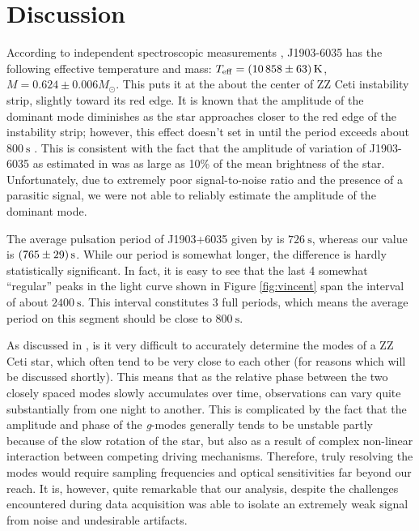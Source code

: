 \documentclass{aastex631}
\begin{document}
\section{Discussion}
According to independent spectroscopic measurements
\citep{Limoges_2015}, J1903-6035 has the following effective
temperature and mass: $T_{\mathrm{eff}} = \SI{10858\pm 63}{\kelvin}$,
$M=0.624\pm 0.006 M_\odot$. This puts it at the about the center of ZZ
Ceti instability strip, slightly toward its red edge. It is known that
the amplitude of the dominant mode diminishes as the star approaches
closer to the red edge of the instability strip; however, this effect
doesn't set in until the period exceeds about $\SI{800}{\second}$
\citep{Vincent_2020}. This is consistent with the fact that the
amplitude of variation of J1903-6035 as estimated in
\citet{Vincent_2020} was as large as 10\% of the mean brightness of
the star. Unfortunately, due to extremely poor signal-to-noise ratio
and the presence of a parasitic signal, we were not able to reliably
estimate the amplitude of the dominant mode.


The average pulsation period of J1903+6035 given by
\citet{Vincent_2020} is $\SI{726}{\second}$, whereas our value is
$\SI{765\pm29}{\second}$. While our period is somewhat longer, the
difference is hardly statistically significant. In fact, it is easy to
see that the last 4 somewhat ``regular'' peaks in the light curve
shown in Figure \ref{fig:vincent} span the interval of about
$\SI{2400}{\second}$. This interval constitutes 3 full periods, which
means the average period on this segment should be close to
$\SI{800}{\second}$.

As discussed in \citet{Kepler_1983}, is it very difficult to
accurately determine the modes of a ZZ Ceti star, which often tend to
be very close to each other (for reasons which will be discussed
shortly). This means that as the relative phase between the two
closely spaced modes slowly accumulates over time, observations can
vary quite substantially from one night to another. This is
complicated by the fact that the amplitude and phase of the
\emph{g}-modes generally tends to be unstable \citep{Bergeron_1990}
partly because of the slow rotation of the star, but also as a result
of complex non-linear interaction between competing driving
mechanisms. Therefore, truly resolving the modes would require
sampling frequencies and optical sensitivities far beyond our
reach. It is, however, quite remarkable that our analysis, despite the
challenges encountered during data acquisition was able to isolate an
extremely weak signal from noise and undesirable artifacts.
\end{document}

